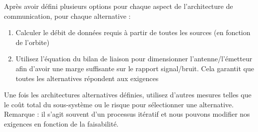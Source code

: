 Après avoir défini plusieurs options pour chaque aspect de l’architecture de communication, pour chaque alternative :

\begin{enumerate}
\item Calculer le débit de données requis à partir de toutes les sources (en fonction de l'orbite)
\item Utilisez l'équation du bilan de liaison pour dimensionner l'antenne/l'émetteur afin d'avoir une marge suffisante sur le rapport signal/bruit. Cela garantit que toutes les alternatives répondent aux exigences

\end{enumerate}
Une fois les architectures alternatives définies, utilisez d'autres mesures telles que le coût total du sous-système ou le risque pour sélectionner une alternative. Remarque : il s'agit souvent d'un processus itératif et nous pouvons modifier nos exigences en fonction de la faisabilité.
